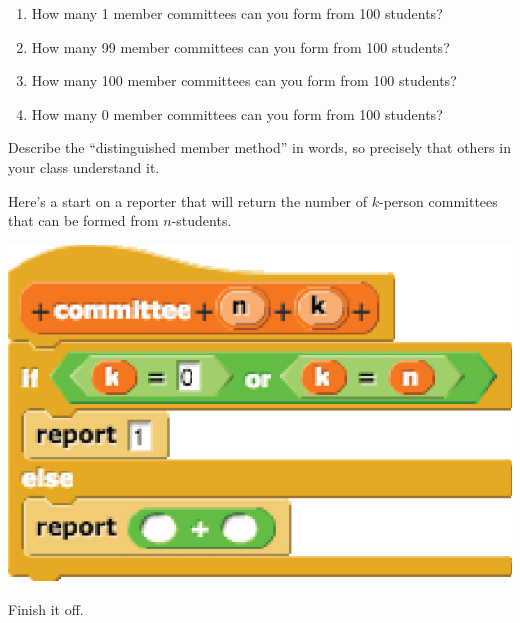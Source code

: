 \documentclass[12pt,raggedbottom,nosectionbreak]{cme}
\begin{document}
\begin{problem}
\begin{enumerate}
\item How many 1 member committees can you form from 100 students?

\item How many 99 member committees can you form from 100 students?

\item How many 100 member committees can you form from 100 students?




\item How many 0 member committees can you form from 100 students?

\end{enumerate}
\end{problem}


\begin{problem}
Describe the ``distinguished member method'' in words, so precisely that others in your class understand it.
\end{problem}


\begin{problem}  Here's a start on a reporter that will return the number of $k$-person committees that can be formed from $n$-students.
\begin{center}

\includegraphics[scale=.6]{binco}


\end{center}
Finish it off.
\end{problem}
\end{document}
